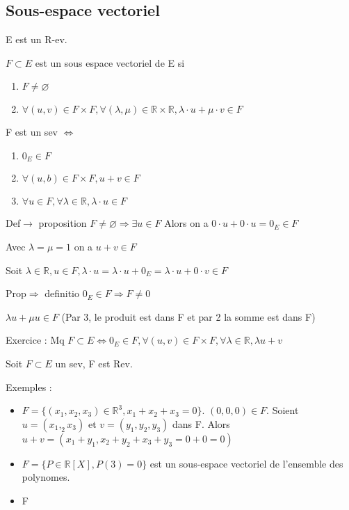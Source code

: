 \documentclass[french]{yLectureNote}
\newcommand{\R}[0]{\mathbb{R}}
\begin{document}
\subsection{Sous-espace vectoriel}
E est un R-ev.
\begin{definition}
\(F\subset E\) est un sous espace vectoriel de E si
\begin{enumerate}
 \item \(F\neq \varnothing\)
 \item \(\forall (u,v) \in F\times F, \forall (\lambda,\mu)\in\R\times \R, \lambda \cdot u+ \mu \cdot v \in F\)
\end{enumerate}

\end{definition}
\begin{proposition}
F est un sev \(\iff\)
\begin{enumerate}
 \item \(0_E \in F\)
 \item \(\forall (u,b) \in F\times F, u+v \in F\)
 \item \(\forall u\in F, \forall \lambda \in\R, \lambda \cdot u \in F\)
\end{enumerate}
\end{proposition}
\begin{myproof}
Def\(\to\) proposition
\(F\neq \varnothing \Rightarrow \exists u\in F\) Alors on a \(0\cdot u + 0\cdot u = 0_E\in F\)

Avec \(\lambda = \mu = 1\) on a \(u+v \in F\)

Soit \(\lambda \in\R,u\in F, \lambda \cdot u = \lambda \cdot u + 0_E = \lambda \cdot u + 0\cdot v \in F\)

Prop\(\Rightarrow\) definitio
\(0_E \in F \Rightarrow F\neq 0\)

\(\lambda u + \mu u \in F \) (Par 3, le produit est dans F et par 2 la somme est dans F)
\end{myproof}
Exercice : Mq \(F\subset E\iff 0_E\in F, \forall(u,v)\in F\times F,\forall \lambda \in\R, \lambda u + v \)
\begin{proposition}
Soit \(F\subset E\) un sev, F est Rev.
\end{proposition}
Exemples : \begin{itemize}
            \item \(F = \{(x_1,x_2,x_3)\in\R^3, x_1+x_2+x_3 = 0\}\). \((0,0,0)\in F\). Soient \(u = (x_1,_2x_3)\) et \(v=(y_1,y_2,y_3)\) dans F. Alors \(u+v = (x_1+y_1,x_2+y_2+x_3+y_3 = 0+0 =0)\)
            \item \(F = \{P\in\R[X],P(3)= 0\}\)  est un sous-espace vectoriel de l'ensemble des polynomes.
            \item F
           \end{itemize}
\end{document}
